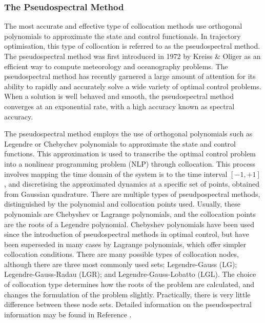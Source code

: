 \subsubsection{The Pseudospectral Method}\label{sec:PS}


The most accurate and effective type of collocation methods use orthogonal polynomials to approximate the state and control functionals\cite{Fahroo2000}. In trajectory optimisation, this type of collocation is referred to as the pseudospectral method\cite{Kelly2015}. 
The pseudospectral method was first introduced in 1972 by Kreiss \& Oliger\cite{Kreiss1972} as an efficient way to compute meteorology and oceanography problems. The pseudospectral method has recently garnered a large amount of attention for its ability to rapidly and accurately solve a wide variety of optimal control problems.  When a solution is well behaved and smooth, the pseudospectral method converges at an exponential rate, with a high accuracy known as spectral accuracy\cite{Ross2004,Darby2011a}. 

The pseudospectral method employs the use of orthogonal polynomials such as Legendre or Chebychev polynomials to approximate the state and control functions.
This approximation is used to transcribe the optimal control problem into a nonlinear programming problem (NLP) through collocation. This process involves mapping the time domain of the system is to the time interval $[-1,+1]$, and discretising the approximated dynamics at a specific set of points, obtained from Gaussian quadrature\cite{Fahroo2000,Huntington2007,Kelly2015,Rao2009,Garg2011}. 
There are multiple types of pseudpospectral methods, distinguished by the polynomial and collocation points used. Usually, these polynomials are Chebyshev or Lagrange polynomials\cite{Fahroo2000,Rao2009}, and the collocation points are the roots of a Legendre polynomial\cite{Garg2009}. Chebyshev polynomials have been used since the introduction of pseudospectral methods in optimal control, but have been superseded in many cases by Lagrange polynomials, which offer simpler collocation conditions\cite{Rao2009}. 
There are many possible types of collocation nodes, although there are three most commonly used sets; Legendre-Gauss (LG); Legendre-Gauss-Radau (LGR); and Legendre-Gauss-Lobatto (LGL)\cite{Garg2009,Rao2009}. The choice of collocation type determines how the roots of the problem are calculated, and changes the formulation of the problem slightly\cite{Garg2009}. Practically, there is very little difference between these node sets\cite{Garg2009}.
Detailed information on the pseudospectral information may be found in Reference \cite{Huntington2007}.


